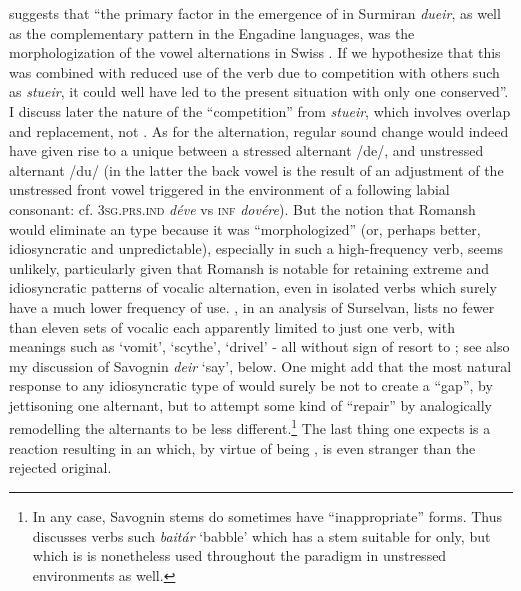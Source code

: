 \documentclass[output=paper,
modfonts
]{LSP/langsci}
\begin{document}
\citet[32]{anderson2010a} suggests that ``the primary factor in the emergence of
 in Surmiran \emph{dueir}, as well as the complementary
pattern in the Engadine languages, was the morphologization of the vowel
alternations in Swiss . If we hypothesize that this was
combined with reduced use of the verb due to competition with others
such as \emph{stueir}, it could well have led to the present situation with
only one  conserved''. I discuss later the nature of the
``competition'' from \emph{stueir}, which involves overlap and
replacement, not . As for the alternation, regular sound
change would indeed have given rise to a unique  between a
stressed alternant /de/, and unstressed alternant /du/ (in the latter
the back vowel is the result of an adjustment of the unstressed front
vowel triggered in the environment of a following labial consonant: cf.
 \textsc{3sg.prs.ind} \emph{déve} vs \textsc{inf} \emph{dovére}).
But the notion that Romansh would eliminate an  type because
it was ``morphologized'' (or, perhaps better, idiosyncratic and
unpredictable), especially in such a high-frequency verb, seems
unlikely, particularly given that Romansh is notable for retaining
extreme and idiosyncratic patterns of vocalic alternation, even in
isolated verbs which surely have a much lower frequency of use. \citet{rogers1972a}, in an analysis of Surselvan, lists no fewer than eleven sets of
vocalic  each apparently limited to just one verb, with
meanings such as `vomit', `scythe', `drivel' - all without sign of
resort to ; see also my discussion of Savognin \emph{deir}
`say', below. One might add that the most natural response to any
idiosyncratic type of  would surely be not to create a ``gap'',
by jettisoning one alternant, but to attempt some kind of ``repair'' by
analogically remodelling the alternants to be less different.\footnote{In
  any case, Savognin stems do sometimes have ``inappropriate'' forms. Thus
  \citet[32]{anderson2011a} discusses verbs such \emph{baitár} `babble' which
  has a stem suitable for  only, but which is is nonetheless used
  throughout the paradigm in unstressed environments as well.} The last
thing one expects is a reaction resulting in an  which, by
virtue of being , is even stranger than the rejected original.
\end{document}
